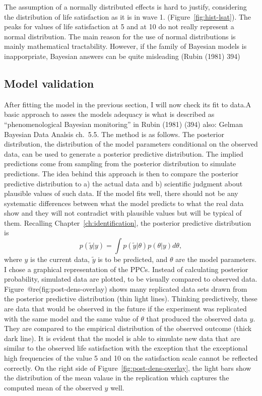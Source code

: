 \documentclass[a4, 12pt]{article}
\begin{document}
The assumption of a normally distributed effects is hard to justify, considering the distribution of life satisfaction as it is in wave 1. (Figure~\ref{fig:hist-lsat}). The peaks for values of life satisfaction at 5 and at 10 do not really represent a normal distribution. The main reason for the use of normal distributions is mainly mathematical tractability. However, if the family of Bayesian models is inapporpriate, Bayesian answers can be quite misleading (Rubin (1981) 394)

\hypertarget{model-validation}{%
\subsection{Model validation}\label{model-validation}}

\label{sec:validation}
After fitting the model in the previous section, I will now check its fit to data.A basic approach to asses the models adequacy is what is described as ``phenomenological Bayesian monitoring'' in Rubin (1981) (394) also: Gelman Bayesian Data Analsis ch.~5.5. The method is as follows. The posterior distribution, the distribution of the model parameters conditional on the observed data, can be used to generate a posterior predictive distribution. The implied predictions come from sampling from the posterior distribution to simulate predictions. The idea behind this approach is then to compare the posterior predictive distribution to a) the actual data and b) scientific judgment about plausible values of such data. If the model fits well, there should not be any systematic differences between what the model predicts to what the real data show and they will not contradict with plausible values but will be typical of them. Recalling Chapter~\ref{ch:identification}, the posterior predictive distribution is
\[p(\tilde{y}|y) =\int p(\tilde{y}|\theta)p(\theta|y)d\theta,\]
where \(y\) is the current data, \(\tilde y\) is to be predicted, and \(\theta\) are the model parameters.
I chose a graphical representation of the PPCs. Instead of calculating posterior probability, simulated data are plotted, to be visually compared to observed data.
Figure~@re(fig:post-dens-overlay) shows many replicated data sets drawn from the posterior predictive distribution (thin light lines). Thinking predictively, these are data that would be observed in the future if the experiment was replicated with the same model and the same value of \(\theta\) that produced the observed data \(y\). They are compared to the empirical distribution of the observed outcome (thick dark line). It is evident that the model is able to simulate new data that are similar to the observed life satisfaction with the exception that the exceptional high frequencies of the value 5 and 10 on the satisfaction scale cannot be reflected correctly.
On the right side of Figure~\ref{fig:post-dens-overlay}, the light bars show the distribution of the mean valaue in the replication which captures the computed mean of the observed \(y\) well.
\end{document}
